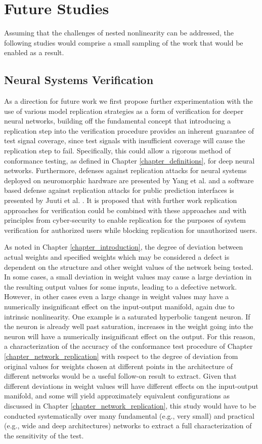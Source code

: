\section{Future Studies}
Assuming that the challenges of nested nonlinearity can be addressed, the following studies would comprise a small sampling of the work that would be enabled as a result.

\subsection{Neural Systems Verification}
As a direction for future work we first propose further experimentation with the use of various model replication strategies as a form of verification for deeper neural networks, building off the fundamental concept that introducing a replication step into the verification procedure provides an inherent guarantee of test signal coverage, since test signals with insufficient coverage will cause the replication step to fail.  Specifically, this could allow a rigorous method of conformance testing, as defined in Chapter \ref{chapter_definitions}, for deep neural networks.  Furthermore, defenses against replication attacks for neural systems deployed on neuromorphic hardware are presented by Yang et al. \cite{yang_thwarting_2019} and a software based defense against replication attacks for public prediction interfaces is presented by Juuti et al. \cite{juuti_prada_2019}.  It is proposed that with further work replication approaches for verification could be combined with these approaches and with principles from cyber-security to enable replication for the purposes of system verification for authorized users while blocking replication for unauthorized users.

As noted in Chapter \ref{chapter_introduction}, the degree of deviation between actual weights and specified weights which may be considered a defect is dependent on the structure and other weight values of the network being tested.  In some cases, a small deviation in weight values may cause a large deviation in the resulting output values for some inputs, leading to a defective network.  However, in other cases even a large change in weight values may have a numerically insignificant effect on the input-output manifold, again due to intrinsic nonlinearity.  One example is a saturated hyperbolic tangent neuron.  If the neuron is already well past saturation, increases in the weight going into the neuron will have a numerically insignificant effect on the output.  For this reason, a characterization of the accuracy of the conformance test procedure of Chapter \ref{chapter_network_replication} with respect to the degree of deviation from original values for weights chosen at different points in the architecture of different networks would be a useful follow-on result to extract.  Given that different deviations in weight values will have different effects on the input-output manifold, and some will yield approximately equivalent configurations as discussed in Chapter \ref{chapter_network_replication}, this study would have to be conducted systematically over many fundamental (e.g., very small) and practical (e.g., wide and deep architectures) networks to extract a full characterization of the sensitivity of the test.

